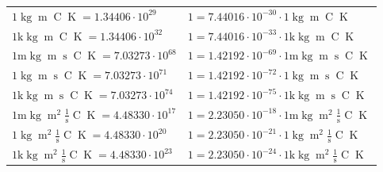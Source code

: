 \begin{center}
\begin{longtable}{l l}
{\color{black}$1 \bm{\mathrm{ }}\operatorname{kg}{\operatorname{m}}{}{\operatorname{C}}{\operatorname{K}} = 1.34406\cdot10^{29} $}   & {\color{black}$ 1 = 7.44016\cdot10^{-30} \cdot 1 \bm{\mathrm{ }}\operatorname{kg}{\operatorname{m}}{}{\operatorname{C}}{\operatorname{K}}$}  \\
{\color{gray}$1 \bm{\mathrm{ k}}\operatorname{kg}{\operatorname{m}}{}{\operatorname{C}}{\operatorname{K}} = 1.34406\cdot10^{32} $}   & {\color{gray}$ 1 = 7.44016\cdot10^{-33} \cdot 1 \bm{\mathrm{ k}}\operatorname{kg}{\operatorname{m}}{}{\operatorname{C}}{\operatorname{K}}$}  \\
{\color{gray}$1 \bm{\mathrm{ m}}\operatorname{kg}{\operatorname{m}}{\operatorname{s}}{\operatorname{C}}{\operatorname{K}} = 7.03273\cdot10^{68} $}   & {\color{gray}$ 1 = 1.42192\cdot10^{-69} \cdot 1 \bm{\mathrm{ m}}\operatorname{kg}{\operatorname{m}}{\operatorname{s}}{\operatorname{C}}{\operatorname{K}}$}  \\
{\color{black}$1 \bm{\mathrm{ }}\operatorname{kg}{\operatorname{m}}{\operatorname{s}}{\operatorname{C}}{\operatorname{K}} = 7.03273\cdot10^{71} $}   & {\color{black}$ 1 = 1.42192\cdot10^{-72} \cdot 1 \bm{\mathrm{ }}\operatorname{kg}{\operatorname{m}}{\operatorname{s}}{\operatorname{C}}{\operatorname{K}}$}  \\
{\color{gray}$1 \bm{\mathrm{ k}}\operatorname{kg}{\operatorname{m}}{\operatorname{s}}{\operatorname{C}}{\operatorname{K}} = 7.03273\cdot10^{74} $}   & {\color{gray}$ 1 = 1.42192\cdot10^{-75} \cdot 1 \bm{\mathrm{ k}}\operatorname{kg}{\operatorname{m}}{\operatorname{s}}{\operatorname{C}}{\operatorname{K}}$}  \\
{\color{gray}$1 \bm{\mathrm{ m}}\operatorname{kg}{\operatorname{m}^2}\frac1{\operatorname{s}}{\operatorname{C}}{\operatorname{K}} = 4.48330\cdot10^{17} $}   & {\color{gray}$ 1 = 2.23050\cdot10^{-18} \cdot 1 \bm{\mathrm{ m}}\operatorname{kg}{\operatorname{m}^2}\frac1{\operatorname{s}}{\operatorname{C}}{\operatorname{K}}$}  \\
{\color{black}$1 \bm{\mathrm{ }}\operatorname{kg}{\operatorname{m}^2}\frac1{\operatorname{s}}{\operatorname{C}}{\operatorname{K}} = 4.48330\cdot10^{20} $}   & {\color{black}$ 1 = 2.23050\cdot10^{-21} \cdot 1 \bm{\mathrm{ }}\operatorname{kg}{\operatorname{m}^2}\frac1{\operatorname{s}}{\operatorname{C}}{\operatorname{K}}$}  \\
{\color{gray}$1 \bm{\mathrm{ k}}\operatorname{kg}{\operatorname{m}^2}\frac1{\operatorname{s}}{\operatorname{C}}{\operatorname{K}} = 4.48330\cdot10^{23} $}   & {\color{gray}$ 1 = 2.23050\cdot10^{-24} \cdot 1 \bm{\mathrm{ k}}\operatorname{kg}{\operatorname{m}^2}\frac1{\operatorname{s}}{\operatorname{C}}{\operatorname{K}}$}  \\

\end{longtable}
\end{center}

